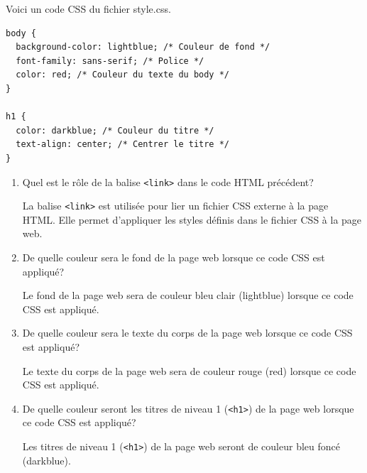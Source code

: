\documentclass[11pt, a4paper, tikz,border=10pt]{report}
\def\ptsexoD{4}
\begin{document}
    \bigskip

    \exods{\ptsexoD}

    Voici un code CSS du fichier style.css. 

    \begin{lstlisting}[numbers=none]
body {
  background-color: lightblue; /* Couleur de fond */
  font-family: sans-serif; /* Police */
  color: red; /* Couleur du texte du body */
}

h1 {
  color: darkblue; /* Couleur du titre */
  text-align: center; /* Centrer le titre */
}
    \end{lstlisting}

    \begin{enumerate}
        \item Quel est le rôle de la balise \texttt{<link>} dans le code HTML précédent?
        
        \begin{blocvisible}[height=2]
            La balise \texttt{<link>} est utilisée pour lier un fichier CSS externe à la page HTML. Elle permet d'appliquer les styles définis dans le fichier CSS à la page web.
\end{blocvisible}
        
\medskip

        \item De quelle couleur sera le fond de la page web lorsque ce code CSS est appliqué?
        
        \begin{blocvisible}[height=1]
            Le fond de la page web sera de couleur bleu clair (lightblue) lorsque ce code CSS est appliqué.
            
        \end{blocvisible}

        \medskip

        \item De quelle couleur sera le texte du corps de la page web lorsque ce code CSS est appliqué?
        
        \begin{blocvisible}[height=1]
            Le texte du corps de la page web sera de couleur rouge (red) lorsque ce code CSS est appliqué.  
        \end{blocvisible}

        \medskip

        \item De quelle couleur seront les titres de niveau 1 (\texttt{<h1>}) de la page web lorsque ce code CSS est appliqué?
        
        \begin{blocvisible}[height=1]
            Les titres de niveau 1 (\texttt{<h1>}) de la page web seront de couleur bleu foncé (darkblue).
        \end{blocvisible}

        \medskip

        \end{enumerate}
\end{document}
